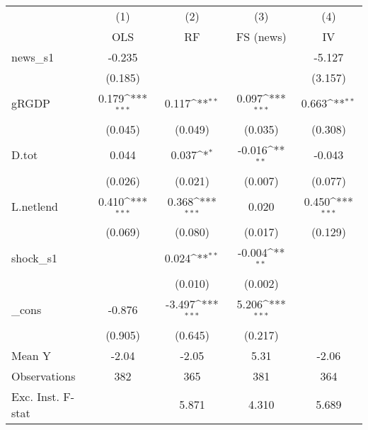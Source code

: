 {
\def\sym#1{\ifmmode^{#1}\else\(^{#1}\)\fi}
\begin{tabular}{l*{4}{c}}
\toprule
            &\multicolumn{1}{c}{(1)}&\multicolumn{1}{c}{(2)}&\multicolumn{1}{c}{(3)}&\multicolumn{1}{c}{(4)}\\
            &\multicolumn{1}{c}{OLS}&\multicolumn{1}{c}{RF}&\multicolumn{1}{c}{FS (news)}&\multicolumn{1}{c}{IV}\\
\midrule
news\_s1     &      -0.235         &                     &                     &      -5.127         \\
            &     (0.185)         &                     &                     &     (3.157)         \\
\addlinespace
gRGDP       &       0.179\sym{***}&       0.117\sym{**} &       0.097\sym{***}&       0.663\sym{**} \\
            &     (0.045)         &     (0.049)         &     (0.035)         &     (0.308)         \\
\addlinespace
D.tot       &       0.044         &       0.037\sym{*}  &      -0.016\sym{**} &      -0.043         \\
            &     (0.026)         &     (0.021)         &     (0.007)         &     (0.077)         \\
\addlinespace
L.netlend   &       0.410\sym{***}&       0.368\sym{***}&       0.020         &       0.450\sym{***}\\
            &     (0.069)         &     (0.080)         &     (0.017)         &     (0.129)         \\
\addlinespace
shock\_s1    &                     &       0.024\sym{**} &      -0.004\sym{**} &                     \\
            &                     &     (0.010)         &     (0.002)         &                     \\
\addlinespace
\_cons      &      -0.876         &      -3.497\sym{***}&       5.206\sym{***}&                     \\
            &     (0.905)         &     (0.645)         &     (0.217)         &                     \\
\midrule
Mean Y      &       -2.04         &       -2.05         &        5.31         &       -2.06         \\
Observations&         382         &         365         &         381         &         364         \\
Exc. Inst. F-stat&                     &       5.871         &       4.310         &       5.689         \\
\bottomrule
\end{tabular}
}
